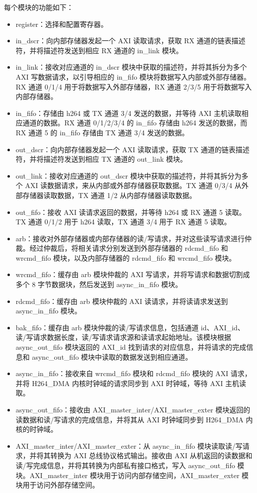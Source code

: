 \documentclass[main\_\_CN.tex]{subfiles}
\begin{document}
每个模块的功能如下：
\begin{itemize}
    \item register：选择和配置寄存器。
    \item in\_dscr：向内部存储器发起一个 AXI 读取请求，获取 RX 通道的链表描述符，并将描述符发送到相应 RX 通道的 in\_link 模块。
    \item in\_link：接收对应通道的 in\_dscr 模块中获取的描述符，并将其拆分为多个 AXI 写数据请求，以引导相应的 in\_fifo 模块将数据写入内部或外部存储器。RX 通道 0/1/4 用于将数据写入外部存储器，RX 通道 2/3/5 用于将数据写入内部存储器。
    \item in\_fifo：存储由 h264 或 TX 通道 3/4 发送的数据，并等待 AXI 主机读取相应通道的数据。RX 通道 0/1/2/3/4 的 in\_fifo 存储由 h264 发送的数据，而 RX 通道 5 的 in\_fifo 存储由 TX 通道 3/4 发送的数据。
    \item out\_dscr：向内部存储器发起一个 AXI 读取请求，获取 TX 通道的链表描述符，并将描述符发送到相应 TX 通道的 out\_link 模块。
    \item out\_link：接收对应通道的 out\_dscr 模块中获取的描述符，并将其拆分为多个 AXI 读数据请求，来从内部或外部存储器获取数据。TX 通道 0/3/4 从外部存储器读取数据，TX 通道 1/2 从内部存储器读取数据。
    \item out\_fifo：接收 AXI 读请求返回的数据，并等待 h264 或 RX 通道 5 读取。TX 通道 0/1/2 用于 h264 读取，TX 通道 3/4 用于 RX 通道 5 读取。
    \item arb：接收对外部存储器或内部存储器的读/写请求，并对这些读写请求进行仲裁。经过仲裁后，将相关请求分别发送到外部存储器的 rdcmd\_fifo 和 wrcmd\_fifo 模块，以及内部存储器的 rdcmd\_fifo 和 wrcmd\_fifo 模块。
    \item wrcmd\_fifo：缓存由 arb 模块仲裁的 AXI 写请求，并将写请求和数据切割成多个 8 字节数据块，然后发送到 async\_in\_fifo 模块。
    \item rdcmd\_fifo：缓存由 arb 模块仲裁的 AXI 读请求，并将读请求发送到 async\_in\_fifo 模块。
    \item bak\_fifo：缓存由 arb 模块仲裁的读/写请求信息，包括通道 id、AXI\_id、读/写请求数据长度，读/写请求请求源和读请求起始地址。该模块根据 async\_out\_fifo 模块返回的 AXI\_id 找到请求的对应信息，并将请求的完成信息和 async\_out\_fifo 模块中读取的数据发送到相应通道。
    \item async\_in\_fifo：接收来自 wrcmd\_fifo 模块和 rdcmd\_fifo 模块的 AXI 请求，并将 H264\_DMA 内核时钟域的请求同步到 AXI 时钟域，等待 AXI 主机读取。
    \item async\_out\_fifo：接收由 AXI\_master\_inter/AXI\_master\_exter 模块返回的读数据和读/写请求的完成信息，并将其从 AXI 时钟域同步到 H264\_DMA 内核的时钟域。
    \item AXI\_master\_inter/AXI\_master\_exter：从 async\_in\_fifo 模块读取读/写请求，并将其转换为 AXI 总线协议格式输出。接收由 AXI 从机返回的读数据和读/写完成信息，并将其转换为内部私有接口格式，写入 async\_out\_fifo 模块。AXI\_master\_inter 模块用于访问内部存储空间，AXI\_master\_exter 模块用于访问外部存储空间。

\end{itemize}
\end{document}
